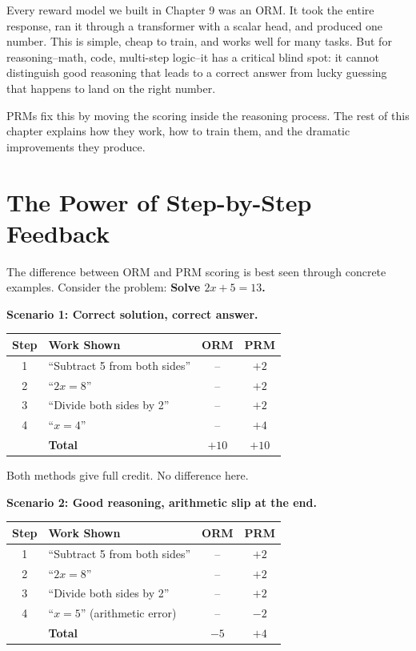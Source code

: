 \begin{chapterenv}
Every reward model we built in Chapter 9 was an ORM. It took the entire response, ran it through a transformer with a scalar head, and produced one number. This is simple, cheap to train, and works well for many tasks. But for reasoning--math, code, multi-step logic--it has a critical blind spot: it cannot distinguish good reasoning that leads to a correct answer from lucky guessing that happens to land on the right number.

PRMs fix this by moving the scoring inside the reasoning process. The rest of this chapter explains how they work, how to train them, and the dramatic improvements they produce.

\section{The Power of Step-by-Step Feedback}

The difference between ORM and PRM scoring is best seen through concrete examples. Consider the problem: \textbf{Solve $2x + 5 = 13$.}

\textbf{Scenario 1: Correct solution, correct answer.}

\begin{center}
\begin{tabular}{clcc}
\toprule
\textbf{Step} & \textbf{Work Shown} & \textbf{ORM} & \textbf{PRM} \\
\midrule
1 & ``Subtract 5 from both sides'' & -- & $+2$ \\
2 & ``$2x = 8$'' & -- & $+2$ \\
3 & ``Divide both sides by 2'' & -- & $+2$ \\
4 & ``$x = 4$'' & -- & $+4$ \\
\midrule
& \textbf{Total} & $+10$ & $+10$ \\
\bottomrule
\end{tabular}
\end{center}

Both methods give full credit. No difference here.

\textbf{Scenario 2: Good reasoning, arithmetic slip at the end.}

\begin{center}
\begin{tabular}{clcc}
\toprule
\textbf{Step} & \textbf{Work Shown} & \textbf{ORM} & \textbf{PRM} \\
\midrule
1 & ``Subtract 5 from both sides'' & -- & $+2$ \\
2 & ``$2x = 8$'' & -- & $+2$ \\
3 & ``Divide both sides by 2'' & -- & $+2$ \\
4 & ``$x = 5$'' (arithmetic error) & -- & $-2$ \\
\midrule
& \textbf{Total} & $-5$ & $+4$ \\
\bottomrule
\end{tabular}
\end{center}


\end{chapterenv}
